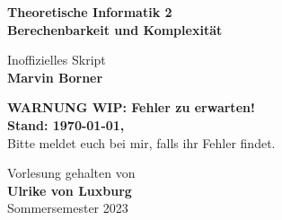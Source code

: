 \begin{titlepage}
	\begin{center}
		\vspace*{1cm}

		{\huge\textbf{Theoretische Informatik 2\bigskip\\Berechenbarkeit und Komplexität}}

		\vspace{0.5cm}
		{\Large Inoffizielles Skript}\\
		\textbf{Marvin Borner}

		\vfill
		{\Large \textbf{WARNUNG WIP: Fehler zu erwarten!}\\\textbf{Stand: \today, \currenttime}}\\
		{\large Bitte meldet euch bei mir, falls ihr Fehler findet.}
		\vfill

		Vorlesung gehalten von\\
		\textbf{Ulrike von Luxburg}\\
		Sommersemester 2023
	\end{center}
\end{titlepage}
